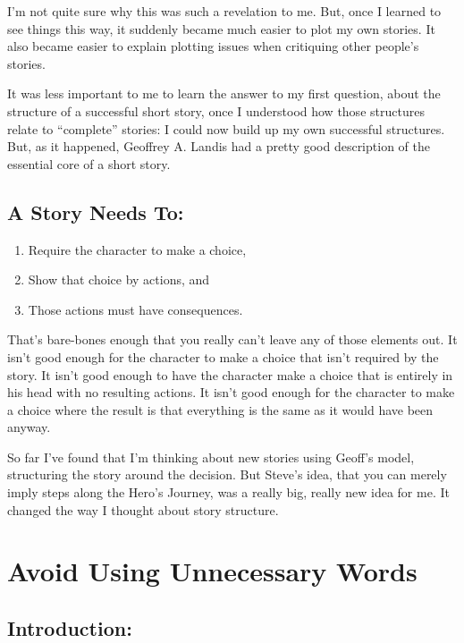 \documentclass[openleft,oneside,showtrims]{memoir}
\begin{document}
I’m not quite sure why this was such a revelation to me. But, once I learned to see things this way, it suddenly became much easier to plot my own stories. It also became easier to explain plotting issues when critiquing other people’s stories.

It was less important to me to learn the answer to my first question, about the structure of a 
successful short story, once I understood how those structures relate to “complete” stories: I could now build up my own successful structures. But, as it happened, Geoffrey A. Landis had a pretty good description of the essential core of a short story.

\section{A Story Needs To:}
\label{sec:orgadbb2df}

\begin{enumerate}
\item Require the character to make a choice,

\item Show that choice by actions, and

\item Those actions must have consequences.
\end{enumerate}

That’s bare-bones enough that you really can’t leave any of those elements out. It isn’t good enough for the character to make a choice that isn't required by the story.  It isn't good enough to have the character make a choice that is entirely in his head with no resulting actions. It isn't good enough for the character to make a choice where the result is that everything is the same as it would have been anyway.

So far I’ve found that I’m thinking about new stories using Geoff’s model, structuring the story around the decision.  But Steve’s idea, that you can merely imply steps along the Hero’s Journey, was a really big, really new idea for me. It changed the way I thought about story structure.

\chapter{Avoid Using Unnecessary Words}
\label{sec:org6c0bcaf}
\label{CHAPTER_avoid-using-unnecessary-words}
\section{Introduction:}
\label{sec:orgcba48a4}
\end{document}
